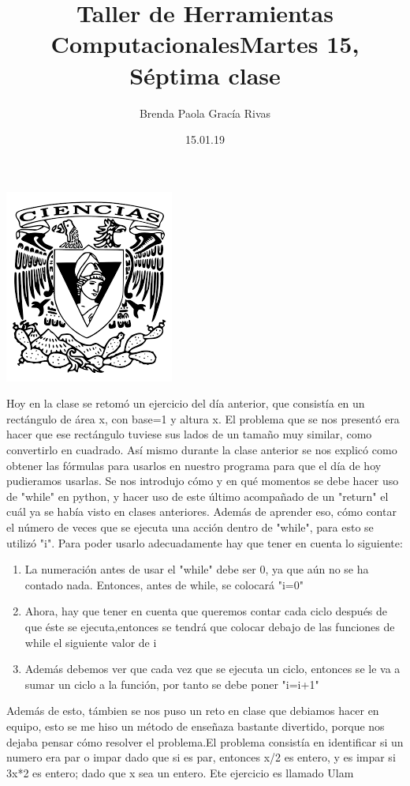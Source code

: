 \documentclass[letterpaper, 12pt, oneside]{article}
\title{\huge \color{green}Taller de Herramientas Computacionales}
\author{Brenda Paola Gracía Rivas}
\date{15.01.19}
\begin{document}
	\maketitle
	\begin{center}
		\includegraphics[scale=1.0]{1.png}
	\end{center}
	\newpage
	\title{\huge Martes 15, Séptima clase\\}
	Hoy en la clase se retomó un ejercicio del día anterior, que consistía en un rectángulo de área x, con base=1 y altura x. El problema que se nos presentó era hacer que ese rectángulo tuviese sus lados de un tamaño muy similar, como convertirlo en cuadrado.
	Así mismo durante la clase anterior se nos explicó como obtener las fórmulas para usarlos en nuestro programa para que el día de hoy pudieramos usarlas. Se nos introdujo cómo y en qué momentos se debe hacer uso de "while" en python, y hacer uso de este último acompañado de un "return" el cuál ya se había visto en clases anteriores.
	Además de aprender eso, cómo contar el número de veces que se ejecuta una acción dentro de "while", para esto se utilizó "i". Para poder usarlo adecuadamente hay que tener en cuenta lo siguiente:
	\begin{enumerate}
		\item 
		La numeración antes de usar el "while" debe ser 0, ya que aún no se ha contado nada. Entonces, antes de while, se colocará "i=0"
		\item 
		Ahora, hay que tener en cuenta que queremos contar cada ciclo después de que éste se ejecuta,entonces se tendrá que colocar debajo de las funciones de while el siguiente valor de i
		\item 
		Además debemos ver que cada vez que se ejecuta un ciclo, entonces se le va a sumar un ciclo a la función, por tanto se debe poner "i=i+1"
	\end{enumerate}
	 Además de esto, támbien se nos puso un reto en clase que debiamos hacer en equipo, esto se me hiso un método de enseñaza bastante divertido, porque nos dejaba pensar cómo resolver el problema.El problema consistía en identificar si un numero era par o impar dado que si es par, entonces x/2 es entero, y es impar si 3x*2 es entero; dado que x sea un entero. Ete ejercicio es llamado Ulam
\end{document}
